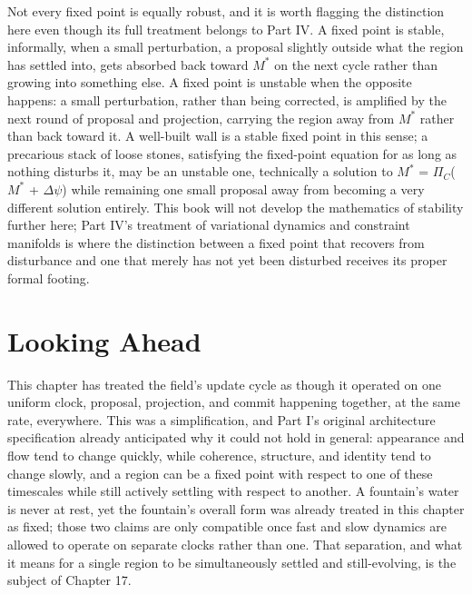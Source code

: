 Not every fixed point is equally robust, and it is worth flagging the distinction here even though its full treatment belongs to Part IV. A fixed point is stable, informally, when a small perturbation, a proposal slightly outside what the region has settled into, gets absorbed back toward \(M^*\) on the next cycle rather than growing into something else. A fixed point is unstable when the opposite happens: a small perturbation, rather than being corrected, is amplified by the next round of proposal and projection, carrying the region away from \(M^*\) rather than back toward it. A well-built wall is a stable fixed point in this sense; a precarious stack of loose stones, satisfying the fixed-point equation for as long as nothing disturbs it, may be an unstable one, technically a solution to \(M^*\) = \(\Pi_C\)(\(M^*\) + \(\Delta\psi\)) while remaining one small proposal away from becoming a very different solution entirely. This book will not develop the mathematics of stability further here; Part IV's treatment of variational dynamics and constraint manifolds is where the distinction between a fixed point that recovers from disturbance and one that merely has not yet been disturbed receives its proper formal footing.

\section{Looking Ahead}

This chapter has treated the field's update cycle as though it operated on one uniform clock, proposal, projection, and commit happening together, at the same rate, everywhere. This was a simplification, and Part I's original architecture specification already anticipated why it could not hold in general: appearance and flow tend to change quickly, while coherence, structure, and identity tend to change slowly, and a region can be a fixed point with respect to one of these timescales while still actively settling with respect to another. A fountain's water is never at rest, yet the fountain's overall form was already treated in this chapter as fixed; those two claims are only compatible once fast and slow dynamics are allowed to operate on separate clocks rather than one. That separation, and what it means for a single region to be simultaneously settled and still-evolving, is the subject of Chapter 17.
